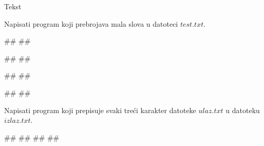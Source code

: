 \begin{Exercise}[label=v3_06] 
Tekst
\end{Exercise}
\begin{Answer}[ref=v3_06]
\end{Answer}







\begin{Exercise}[label=p3_01] 
Napisati program koji prebrojava mala slova u datoteci $test.txt$. \\
\begin{miditest}
\begin{upotreba}{1}
##
##

#\naslovIzlaz#
##
\end{upotreba}
\end{miditest}
\begin{miditest}
\begin{upotreba}{2}
##
##

#\naslovIzlaz#
##
\end{upotreba}
\end{miditest}
\end{Exercise}
\begin{Answer}[ref=p3_01]
\end{Answer}

\begin{Exercise}[label=p3_02] 
Napisati program koji prepisuje svaki treći karakter datoteke $ulaz.txt$ u datoteku $izlaz.txt$.\\
\begin{miditest}
\begin{upotreba}{1}
##
##
##
##
\end{upotreba}
\end{miditest}

\end{Exercise}
\begin{Answer}[ref=p3_02]
\end{Answer}

